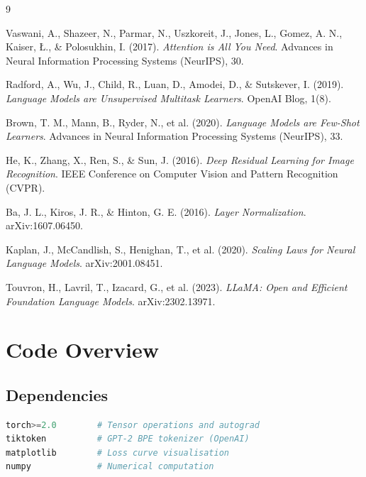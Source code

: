 \documentclass[12pt,a4paper]{article}
\begin{document}
\newpage
\begin{thebibliography}{9}

Vaswani, A., Shazeer, N., Parmar, N., Uszkoreit, J., Jones, L., Gomez, A. N., Kaiser, \L{}., \& Polosukhin, I. (2017).
\textit{Attention is All You Need}.
Advances in Neural Information Processing Systems (NeurIPS), 30.

Radford, A., Wu, J., Child, R., Luan, D., Amodei, D., \& Sutskever, I. (2019).
\textit{Language Models are Unsupervised Multitask Learners}.
OpenAI Blog, 1(8).

Brown, T. M., Mann, B., Ryder, N., et al. (2020).
\textit{Language Models are Few-Shot Learners}.
Advances in Neural Information Processing Systems (NeurIPS), 33.

He, K., Zhang, X., Ren, S., \& Sun, J. (2016).
\textit{Deep Residual Learning for Image Recognition}.
IEEE Conference on Computer Vision and Pattern Recognition (CVPR).

Ba, J. L., Kiros, J. R., \& Hinton, G. E. (2016).
\textit{Layer Normalization}.
arXiv:1607.06450.

Kaplan, J., McCandlish, S., Henighan, T., et al. (2020).
\textit{Scaling Laws for Neural Language Models}.
arXiv:2001.08451.

Touvron, H., Lavril, T., Izacard, G., et al. (2023).
\textit{LLaMA: Open and Efficient Foundation Language Models}.
arXiv:2302.13971.

\end{thebibliography}

\newpage
\appendix
\section{Code Overview}

\subsection{Dependencies}

\begin{lstlisting}[language=Python, caption={Required Python Packages}]
torch>=2.0        # Tensor operations and autograd
tiktoken          # GPT-2 BPE tokenizer (OpenAI)
matplotlib        # Loss curve visualisation
numpy             # Numerical computation
\end{lstlisting}
\end{document}
